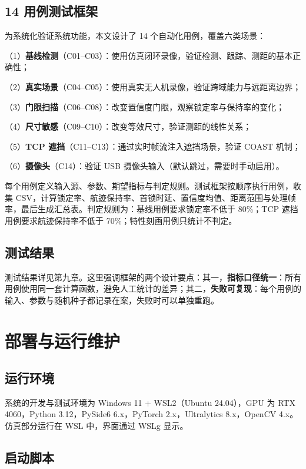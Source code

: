 \subsection{14 用例测试框架}

为系统化验证系统功能，本文设计了 14 个自动化用例，覆盖六类场景：

（1）\textbf{基线检测}（C01--C03）：使用仿真闭环录像，验证检测、跟踪、测距的基本正确性；

（2）\textbf{真实场景}（C04--C05）：使用真实无人机录像，验证跨域能力与远距离边界；

（3）\textbf{门限扫描}（C06--C08）：改变置信度门限，观察锁定率与保持率的变化；

（4）\textbf{尺寸敏感}（C09--C10）：改变等效尺寸，验证测距的线性关系；

（5）\textbf{TCP 遮挡}（C11--C13）：通过实时帧流注入遮挡场景，验证 COAST 机制；

（6）\textbf{摄像头}（C14）：验证 USB 摄像头输入（默认跳过，需要时手动启用）。

每个用例定义输入源、参数、期望指标与判定规则。测试框架按顺序执行用例，收集 CSV，计算锁定率、航迹保持率、首锁时延、置信度均值、距离范围与处理帧率，最后生成汇总表。判定规则为：基线用例要求锁定率不低于 80\%；TCP 遮挡用例要求航迹保持率不低于 70\%；特性刻画用例只统计不判定。

\subsection{测试结果}

测试结果详见第九章。这里强调框架的两个设计要点：其一，\textbf{指标口径统一}：所有用例使用同一套计算函数，避免人工统计的差异；其二，\textbf{失败可复现}：每个用例的输入、参数与随机种子都记录在案，失败时可以单独重跑。

\section{部署与运行维护}

\subsection{运行环境}

系统的开发与测试环境为 Windows 11 + WSL2（Ubuntu 24.04），GPU 为 RTX 4060，Python 3.12，PySide6 6.x，PyTorch 2.x，Ultralytics 8.x，OpenCV 4.x。仿真部分运行在 WSL 中，界面通过 WSLg 显示。

\subsection{启动脚本}

